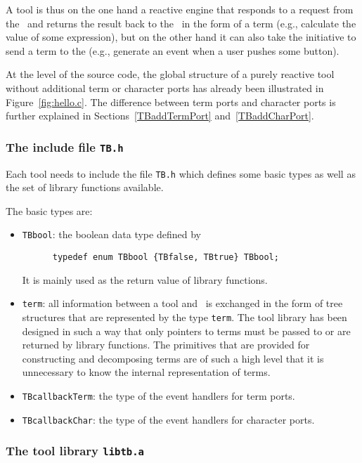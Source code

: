 \documentclass[a4,twoside,noweb]{article} %
\begin{document}
A tool is thus on the one hand a reactive engine that responds to a
request from the \TB\ and returns the result back to the \TB\ in the
form of a term (e.g., calculate the value of some expression), but on
the other hand it can also take the initiative to send a term to the
\TB  (e.g., generate an event when a user pushes some button).

At the level of the source code, the global structure of a purely
reactive tool without additional term or character ports
has already
been illustrated in Figure~\ref{fig:hello.c}.
The difference between term ports and character ports is further explained in 
Sections~\ref{TBaddTermPort} and~\ref{TBaddCharPort}.

\subsubsection{The include file {\tt TB.h}}

Each tool needs to include the file {\tt TB.h}
which defines some basic types as well as the set
of library functions available.

The basic types are:
\begin{itemize}
\item {\tt TBbool}: the boolean data type defined by
\begin{verbatim}
      typedef enum TBbool {TBfalse, TBtrue} TBbool;
\end{verbatim}
It is mainly used as the return value of library functions.

\item {\tt term}: all information between a tool and \TB\ is exchanged
in the form of tree structures that are represented by the type
{\tt term}. The tool library has been designed in such a way that
only pointers to terms must be passed to or are returned by library
functions. The primitives that are provided for constructing
and decomposing terms are of such a high level that it is unnecessary
to know the internal representation of terms.

\item {\tt TBcallbackTerm}: the type of the event handlers for term ports.
\item {\tt TBcallbackChar}: the type of the event handlers for character ports.
\end{itemize}

\subsubsection{The tool library {\tt libtb.a}}
\end{document}
